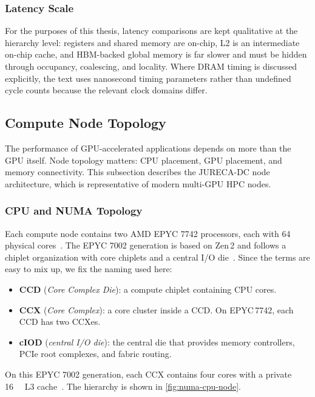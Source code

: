 \subsubsection{Latency Scale}

For the purposes of this thesis, latency comparisons are kept qualitative at
the hierarchy level: registers and shared memory are on-chip, L2 is an
intermediate on-chip cache, and HBM-backed global memory is far slower and must
be hidden through occupancy, coalescing, and locality. Where DRAM timing is
discussed explicitly, the text uses nanosecond timing parameters rather than
undefined cycle counts because the relevant clock domains differ.

\subsection{Compute Node Topology}\label{sec:node-topology}

The performance of GPU-accelerated applications depends on more than the GPU
itself. Node topology matters: CPU placement, GPU placement, and memory
connectivity. This subsection describes the JURECA-DC node architecture, which
is representative of modern multi-GPU HPC nodes.

\subsubsection{CPU and NUMA Topology}

Each compute node contains two AMD EPYC 7742 processors, each with
64 physical cores~\cite{jureca-config}. The EPYC 7002 generation is based on
Zen\,2 and follows a chiplet organization with core chiplets and a central I/O
die~\cite{amd2020epyc7002-rdbms}. Since the terms are easy to mix up, we fix
the naming used here:

\begin{itemize}
  \item \textbf{CCD} (\emph{Core Complex Die}): a compute chiplet containing CPU cores.
  \item \textbf{CCX} (\emph{Core Complex}): a core cluster inside a CCD. On
    EPYC\,7742, each CCD has two CCXes.
  \item \textbf{cIOD} (\emph{central I/O die}): the central die that provides
    memory controllers, PCIe root complexes, and fabric routing.
\end{itemize}

On this EPYC 7002 generation, each CCX contains four cores with a private
\SI{16}{\mega\byte} L3 cache~\cite{amd2020epyc7002-rdbms}. The hierarchy is shown in
\cref{fig:numa-cpu-node}.

